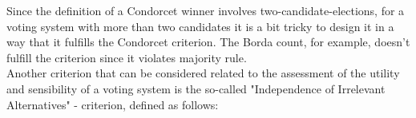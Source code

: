Since the definition of a Condorcet winner involves two-candidate-elections, for a voting system with more than two candidates it is a bit tricky to design it in a way that it fulfills the Condorcet criterion. The Borda count, for example, doesn't fulfill the criterion since it violates majority rule. \\
Another criterion that can be considered related to the assessment of the utility and sensibility of a voting system is the so-called "Independence of Irrelevant Alternatives" - criterion, defined as follows: \\
